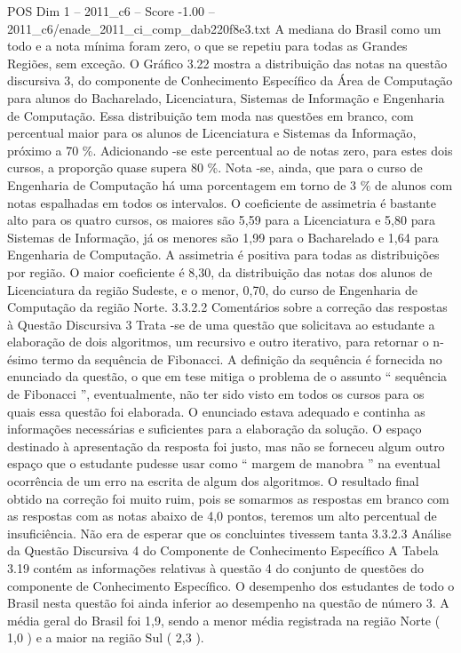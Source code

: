 \begin{textsample}{POS Dim 1 – 2011\_c6 – Score -1.00 – 2011\_c6/enade\_2011\_ci\_comp\_dab220f8e3.txt}
A mediana do Brasil como um todo e a nota mínima foram zero, o que se repetiu para todas as Grandes Regiões, sem exceção.
O Gráfico 3.22 mostra a distribuição das notas na questão discursiva 3, do componente de Conhecimento Específico da Área de Computação para alunos do Bacharelado, Licenciatura, Sistemas de Informação e Engenharia de Computação.
Essa distribuição tem moda nas questões em branco, com percentual maior para os alunos de Licenciatura e Sistemas da Informação, próximo a 70 \%.
Adicionando -se este percentual ao de notas zero, para estes dois cursos, a proporção quase supera 80 \%.
Nota -se, ainda, que para o curso de Engenharia de Computação há uma porcentagem em torno de 3 \% de alunos com notas espalhadas em todos os intervalos.
O coeficiente de assimetria é bastante alto para os quatro cursos, os maiores são 5,59 para a Licenciatura e 5,80 para Sistemas de Informação, já os menores são 1,99 para o Bacharelado e 1,64 para Engenharia de Computação.
A assimetria é positiva para todas as distribuições por região.
O maior coeficiente é 8,30, da distribuição das notas dos alunos de Licenciatura da região Sudeste, e o menor, 0,70, do curso de Engenharia de Computação da região Norte. 3.3.2.2 Comentários sobre a correção das respostas à Questão Discursiva 3 Trata -se de uma questão que solicitava ao estudante a elaboração de dois algoritmos, um recursivo e outro iterativo, para retornar o n-ésimo termo da sequência de Fibonacci.
A definição da sequência é fornecida no enunciado da questão, o que em tese mitiga o problema de o assunto “ sequência de Fibonacci ”, eventualmente, não ter sido visto em todos os cursos para os quais essa questão foi elaborada.
O enunciado estava adequado e continha as informações necessárias e suficientes para a elaboração da solução.
O espaço destinado à apresentação da resposta foi justo, mas não se forneceu algum outro espaço que o estudante pudesse usar como “ margem de manobra ” na eventual ocorrência de um erro na escrita de algum dos algoritmos.
O resultado final obtido na correção foi muito ruim, pois se somarmos as respostas em branco com as respostas com as notas abaixo de 4,0 pontos, teremos um alto percentual de insuficiência.
Não era de esperar que os concluintes tivessem tanta 3.3.2.3 Análise da Questão Discursiva 4 do Componente de Conhecimento Específico A Tabela 3.19 contém as informações relativas à questão 4 do conjunto de questões do componente de Conhecimento Específico.
O desempenho dos estudantes de todo o Brasil nesta questão foi ainda inferior ao desempenho na questão de número 3.
A média geral do Brasil foi 1,9, sendo a menor média registrada na região Norte ( 1,0 ) e a maior na região Sul ( 2,3 ).

\end{textsample}
